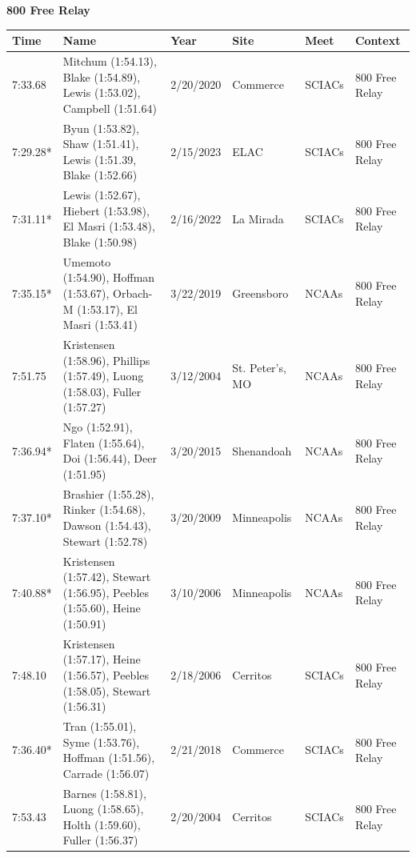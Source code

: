 \begin{table}[H]
\centering
\begin{minipage}[t]{0.6\textwidth}
\centering
\textbf{800 Free Relay}\\[0.1cm]
\begin{tabular}{@{}p{1.8cm}p{2.8cm}p{1.2cm}p{1.4cm}p{1.4cm}p{2.0cm}@{}}
\hline
    \textbf{Time} & \textbf{Name} & \textbf{Year} & \textbf{Site} & \textbf{Meet} & \textbf{Context} \\
\hline
    7:33.68 & Mitchum (1:54.13), Blake (1:54.89), Lewis (1:53.02), Campbell (1:51.64) & 2/20/2020 & Commerce & SCIACs & 800 Free Relay \\
    7:29.28* & Byun (1:53.82), Shaw (1:51.41), Lewis (1:51.39, Blake (1:52.66) & 2/15/2023 & ELAC & SCIACs & 800 Free Relay \\
    7:31.11* & Lewis (1:52.67), Hiebert (1:53.98), El Masri (1:53.48), Blake (1:50.98) & 2/16/2022 & La Mirada & SCIACs & 800 Free Relay \\
    7:35.15* & Umemoto (1:54.90), Hoffman (1:53.67), Orbach-M (1:53.17), El Masri (1:53.41) & 3/22/2019 & Greensboro & NCAAs & 800 Free Relay \\
    7:51.75 & Kristensen (1:58.96), Phillips (1:57.49), Luong (1:58.03), Fuller (1:57.27) & 3/12/2004 & St. Peter's, MO & NCAAs & 800 Free Relay \\
    7:36.94* & Ngo (1:52.91), Flaten (1:55.64), Doi (1:56.44), Deer (1:51.95) & 3/20/2015 & Shenandoah & NCAAs & 800 Free Relay \\
    7:37.10* & Brashier (1:55.28), Rinker (1:54.68), Dawson (1:54.43), Stewart (1:52.78) & 3/20/2009 & Minneapolis & NCAAs & 800 Free Relay \\
    7:40.88* & Kristensen (1:57.42), Stewart (1:56.95), Peebles (1:55.60), Heine (1:50.91) & 3/10/2006 & Minneapolis & NCAAs & 800 Free Relay \\
    7:48.10 & Kristensen (1:57.17), Heine (1:56.57), Peebles (1:58.05), Stewart (1:56.31) & 2/18/2006 & Cerritos & SCIACs & 800 Free Relay \\
    7:36.40* & Tran (1:55.01), Syme (1:53.76), Hoffman (1:51.56), Carrade (1:56.07) & 2/21/2018 & Commerce & SCIACs & 800 Free Relay \\
    7:53.43 & Barnes (1:58.81), Luong (1:58.65), Holth (1:59.60), Fuller (1:56.37) & 2/20/2004 & Cerritos & SCIACs & 800 Free Relay \\
\hline
\end{tabular}
\end{minipage}
\end{table}

